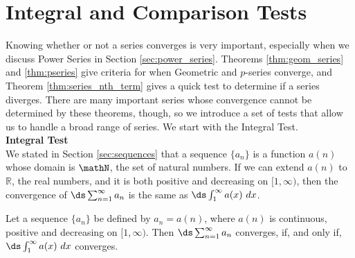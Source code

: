 \section{Integral and Comparison Tests}\label{sec:int_comp_tests}

Knowing whether or not a series converges is very important, especially when we discuss Power Series in Section \ref{sec:power_series}. Theorems \ref{thm:geom_series} and \ref{thm:pseries} give criteria for when Geometric and $p$-series converge, and Theorem \ref{thm:series_nth_term} gives a quick test to determine if a series diverges. There are many important series whose convergence cannot be determined by these theorems, though, so we introduce a set of tests that allow us to handle a broad range of series. We start with the Integral Test.\\


\noindent\textbf{\large Integral Test}\\

We stated in Section \ref{sec:sequences} that a sequence $\{a_n\}$ is a function $a(n)$ whose domain is $\mathN$, the set of natural numbers. If we can extend $a(n)$ to $\mathbb{R}$, the real numbers, and it is both positive and decreasing on $[1,\infty)$, then the convergence of $\ds \sum_{n=1}^\infty a_n$ is the same as $\ds\int_1^\infty a(x)\ dx$. 

{Let a sequence $\{a_n\}$ be defined by $a_n=a(n)$, where $a(n)$ is continuous, positive and decreasing on $[1,\infty)$. Then $\ds \sum_{n=1}^\infty a_n$ converges, if, and only if, $\ds\int_1^\infty a(x)\ dx$ converges.
}

